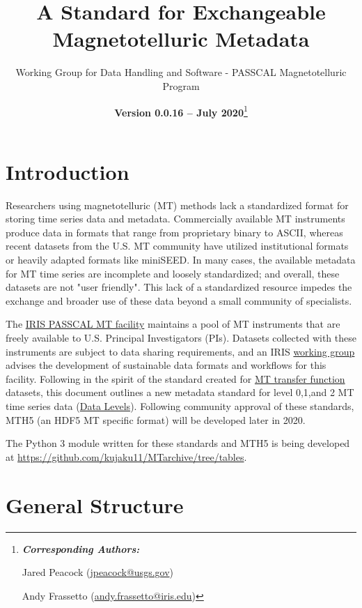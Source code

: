 \documentclass[12pt]{article}
\title{A Standard for Exchangeable Magnetotelluric Metadata}
\date{\textbf{Version 0.0.16 -- July 2020}\footnote{\noindent\textbf{\textit{Corresponding Authors:}}
		
		Jared Peacock (\url{jpeacock@usgs.gov})
		
		Andy Frassetto (\url{andy.frassetto@iris.edu})}}
\author[1]{Working Group for Data Handling and Software - PASSCAL Magnetotelluric Program}
\affil[1]{Portable Array Seismic Studies of the Continental Lithosphere, Incorporated Research Institutions for Seismology}
\begin{document}
	
\maketitle

\clearpage
\newpage
\tableofcontents
{}
\listoftables
\vspace{1cm}


\newpage

\section{Introduction}

Researchers using magnetotelluric (MT) methods lack a standardized format for storing time series data and metadata. Commercially available MT instruments produce data in formats that range from proprietary binary to ASCII, whereas recent datasets from the U.S. MT community have utilized institutional formats or heavily adapted formats like miniSEED. In many cases, the available metadata for MT time series are incomplete and loosely standardized; and overall, these datasets are not "user friendly". This lack of a standardized resource impedes the exchange and broader use of these data beyond a small community of specialists.

The \href{https://www.iris.edu/hq/programs/passcal/magnetotelluric_instrumentation}{IRIS PASSCAL MT facility} maintains a pool of MT instruments that are freely available to U.S. Principal Investigators (PIs). Datasets collected with these instruments are subject to data sharing requirements, and an IRIS \href{https://www.iris.edu/hq/about_iris/governance/mt_soft}{working group} advises the development of sustainable data formats and workflows for this facility. Following in the spirit of the standard created for \href{https://library.seg.org/doi/10.1190/geo2018-0679.1}{MT transfer function} datasets, this document outlines a new metadata standard for level 0,1,and 2 MT time series data (\href{https://earthdata.nasa.gov/collaborate/open-data-services-and-software/data-information-policy/data-levels}{Data Levels}). Following community approval of these standards, MTH5 (an HDF5 MT specific format) will be developed later in 2020.

The Python 3 module written for these standards and MTH5 is being developed at \url{https://github.com/kujaku11/MTarchive/tree/tables}.

\section{General Structure}
\end{document}
